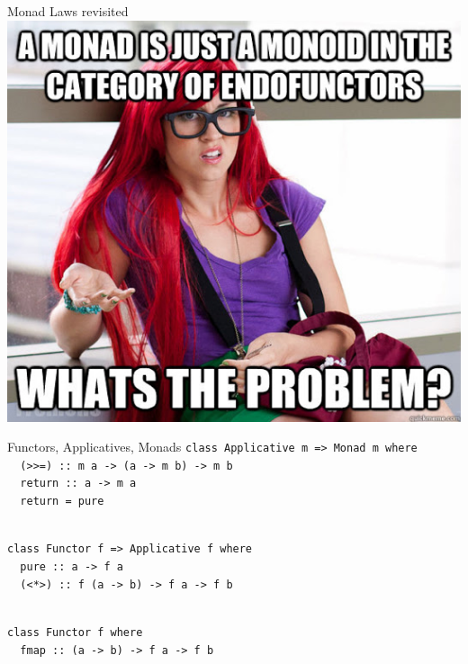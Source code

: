 \documentclass{beamer}
\begin{document}
\begin{frame}{Monad Laws revisited}
  \includegraphics[width=\textwidth]{monoids.jpg}  
\end{frame}

\begin{frame}{Functors, Applicatives, Monads}\pause
  \texttt{class Applicative m => Monad m where\\
    \ \ (>>=) :: m a -> (a -> m b) -> m b\\
    \ \ return :: a -> m a\\
    \ \ return = pure}\\
  \ \\ \pause

  \texttt{class Functor f => Applicative f where\\
    \ \ pure  :: a -> f a\\
    \ \ (<*>) :: f (a -> b) -> f a -> f b}\\
  \ \\ \pause

  \texttt{class Functor f where\\
    \ \ fmap :: (a -> b) -> f a -> f b}
\end{frame}
\end{document}
